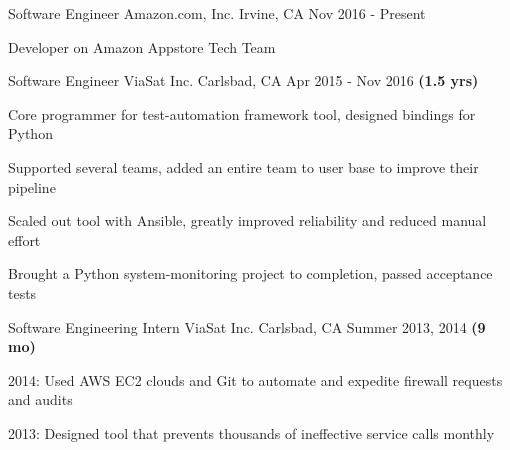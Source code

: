 

\begin{cventries}

  \cventry
    {Software Engineer} %
    {Amazon.com, Inc.} %
    {Irvine, CA} %
    {Nov 2016 - Present \textbf{}} %
    {
      \begin{cvitems} %
        \item {Developer on Amazon Appstore Tech Team}
      \end{cvitems}
    }

  \cventry
    {Software Engineer} %
    {ViaSat Inc.} %
    {Carlsbad, CA} %
    {Apr 2015 - Nov 2016 \textbf{(1.5 yrs)}} %
    {
      \begin{cvitems} %
        \item {Core programmer for test-automation framework tool, designed bindings for Python}
        \item {Supported several teams, added an entire team to user base to improve their pipeline}
        \item {Scaled out tool with Ansible, greatly improved reliability and reduced manual effort}
        \item {Brought a Python system-monitoring project to completion, passed acceptance tests}
      \end{cvitems}
    }

  \cventry
    {Software Engineering Intern} %
    {ViaSat Inc.} %
    {Carlsbad, CA} %
    {Summer 2013, 2014 \textbf{(9 mo)}} %
    {
      \begin{cvitems} %
        \item {2014: Used AWS EC2 clouds and Git to automate and expedite firewall requests and audits}
        \item {2013: Designed tool that prevents thousands of ineffective service calls monthly}
      \end{cvitems}
    }


\end{cventries}
